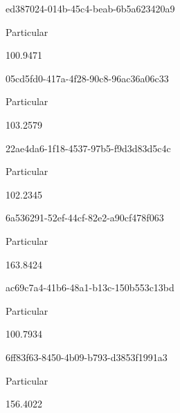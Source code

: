 \documentclass[
  11pt,
  a4paper,
  DIV=11,
  numbers=noendperiod]{scrartcl}
\begin{document}
\n      

ed387024-014b-45c4-beab-6b5a623420a9

\n      

Particular

\n      

100.9471

\n    

\n    

\n      

05cd5fd0-417a-4f28-90c8-96ac36a06c33

\n      

Particular

\n      

103.2579

\n    

\n    

\n      

22ae4da6-1f18-4537-97b5-f9d3d83d5c4c

\n      

Particular

\n      

102.2345

\n    

\n    

\n      

6a536291-52ef-44cf-82e2-a90cf478f063

\n      

Particular

\n      

163.8424

\n    

\n    

\n      

ac69c7a4-41b6-48a1-b13c-150b553c13bd

\n      

Particular

\n      

100.7934

\n    

\n    

\n      

6ff83f63-8450-4b09-b793-d3853f1991a3

\n      

Particular

\n      

156.4022

\n    

\n    

\n      
\end{document}
